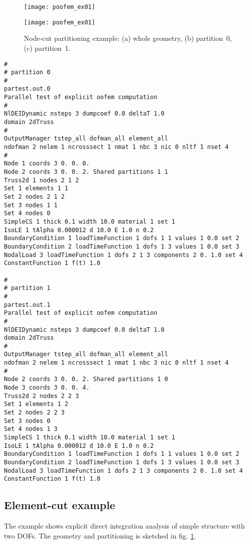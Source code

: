 \documentclass[a4paper]{article}
\begin{document}
\begin{figure}[htb]
\begin{htmlonly}
  \centerline{\texttt{[image: poofem\_ex01]}}
\end{htmlonly}
\centerline{\texttt{[image: poofem\_ex01]}}
\caption{Node-cut partitioning example: (a) whole geometry,
(b) partition~0, (c) partition~1.}
\label{nodecut-ex01}
\end{figure}

\begin{verbatim}
#
# partition 0
#
partest.out.0
Parallel test of explicit oofem computation
#
NlDEIDynamic nsteps 3 dumpcoef 0.0 deltaT 1.0
domain 2dTruss
#
OutputManager tstep_all dofman_all element_all
ndofman 2 nelem 1 ncrosssect 1 nmat 1 nbc 3 nic 0 nltf 1 nset 4
#
Node 1 coords 3 0. 0. 0.
Node 2 coords 3 0. 0. 2. Shared partitions 1 1
Truss2d 1 nodes 2 1 2
Set 1 elements 1 1
Set 2 nodes 2 1 2
Set 3 nodes 1 1
Set 4 nodes 0
SimpleCS 1 thick 0.1 width 10.0 material 1 set 1
IsoLE 1 tAlpha 0.000012 d 10.0 E 1.0 n 0.2
BoundaryCondition 1 loadTimeFunction 1 dofs 1 1 values 1 0.0 set 2
BoundaryCondition 2 loadTimeFunction 1 dofs 1 3 values 1 0.0 set 3
NodalLoad 3 loadTimeFunction 1 dofs 2 1 3 components 2 0. 1.0 set 4
ConstantFunction 1 f(t) 1.0

#
# partition 1
#
partest.out.1
Parallel test of explicit oofem computation
#
NlDEIDynamic nsteps 3 dumpcoef 0.0 deltaT 1.0
domain 2dTruss
#
OutputManager tstep_all dofman_all element_all
ndofman 2 nelem 1 ncrosssect 1 nmat 1 nbc 3 nic 0 nltf 1 nset 4
#
Node 2 coords 3 0. 0. 2. Shared partitions 1 0
Node 3 coords 3 0. 0. 4.
Truss2d 2 nodes 2 2 3
Set 1 elements 1 2
Set 2 nodes 2 2 3
Set 3 nodes 0
Set 4 nodes 1 3
SimpleCS 1 thick 0.1 width 10.0 material 1 set 1
IsoLE 1 tAlpha 0.000012 d 10.0 E 1.0 n 0.2
BoundaryCondition 1 loadTimeFunction 1 dofs 1 1 values 1 0.0 set 2
BoundaryCondition 2 loadTimeFunction 1 dofs 1 3 values 1 0.0 set 3
NodalLoad 3 loadTimeFunction 1 dofs 2 1 3 components 2 0. 1.0 set 4
ConstantFunction 1 f(t) 1.0
\end{verbatim}

\subsection{Element-cut example}
The example shows explicit direct integration analysis of
simple structure with two DOFs. The geometry and partitioning is sketched in
fig. \ref{nodecut-ex01}.
\end{document}
